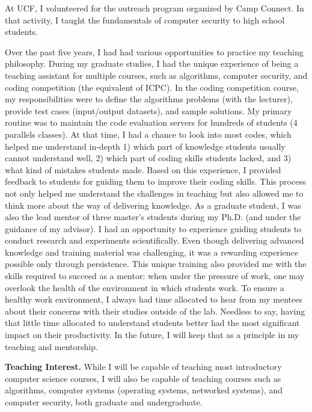 \documentclass{NSF}
\newcommand{\BfPara}[1]{{\noindent\textbf{#1.}}\xspace}
\begin{document}
At UCF, I volunteered for the outreach program organized by Camp Connect. In that activity, I taught the fundamentals of computer security to high school students. 

Over the past five years, I had had various opportunities to practice my teaching philosophy. During my graduate studies, I had the unique experience of being a teaching assistant for multiple courses, such as algorithms, computer security, and coding competition (the equivalent of ICPC). In the coding competition course, my responsibilities were to define the algorithms problems (with the lecturer), provide test cases (input/output datasets), and sample solutions. My primary routine was to maintain the code evaluation servers for hundreds of students (4 parallels classes). At that time, I had a chance to look into most codes, which helped me understand in-depth  1) which part of knowledge students usually cannot understand well, 2) which part of coding skills students lacked, and 3) what kind of mistakes students made. Based on this experience, I provided feedback to students for guiding them to improve their coding skills. This process not only helped me understand the challenges in teaching but also allowed me to think more about the way of delivering knowledge. As a graduate student, I was also the lead mentor of three master's students during my Ph.D. (and under the guidance of my advisor). I had an opportunity to experience guiding students to conduct research and experiments scientifically. Even though delivering advanced knowledge and training material was challenging, it was a rewarding experience possible only through persistence. This unique training also provided me with the skills required to succeed as a mentor: when under the pressure of work, one may overlook the health of the environment in which students work. To ensure a healthy work environment, I always had time allocated to hear from my mentees about their concerns with their studies outside of the lab. Needless to say, having that little time allocated to understand students better had the most significant impact on their productivity. In the future, I will keep that as a principle in my teaching and mentorship. 

\BfPara{Teaching Interest} While I will be capable of teaching most introductory computer science courses, I will also be capable of teaching courses such as algorithms, computer systems (operating systems, networked systems), and computer security, both graduate and undergraduate. 
\end{document}
